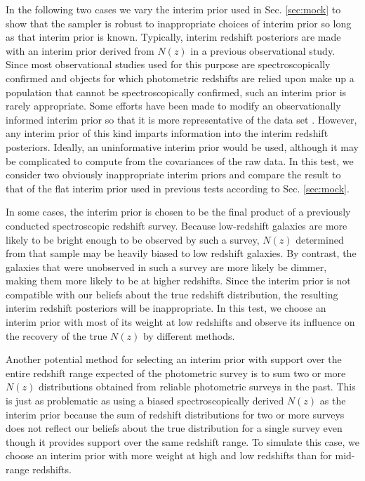 \documentclass[preprint]{aastex}
\begin{document}
In the following two cases we vary the interim prior used in Sec. 
\ref{sec:mock} to show that the sampler is robust to inappropriate choices of 
interim prior so long as that interim prior is known.  Typically, interim 
redshift posteriors are made with an interim prior derived from $N(z)$ in a 
previous observational study.  Since most observational studies used for this 
purpose are spectroscopically confirmed and objects for which photometric 
redshifts are relied upon make up a population that cannot be spectroscopically 
confirmed, such an interim prior is rarely appropriate.  Some efforts have been 
made to modify an observationally informed interim prior so that it is more 
representative of the data set \citep{Sheldon2012}.  However, any interim prior 
of this kind imparts information into the interim redshift posteriors.  
Ideally, an uninformative interim prior would be used, although it may be 
complicated to compute from the covariances of the raw data.  In this test, we 
consider two obviously inappropriate interim priors and compare the result to 
that of the flat interim prior used in previous tests according to Sec. 
\ref{sec:mock}.

In some cases, the interim prior is chosen to be the final product of a 
previously conducted spectroscopic redshift survey.  Because low-redshift 
galaxies are more likely to be bright enough to be observed by such a survey, 
$N(z)$ determined from that sample may be heavily biased to low redshift 
galaxies.  By contrast, the galaxies that were unobserved in such a survey are 
more likely be dimmer, making them more likely to be at higher redshifts.  
Since the interim prior is not compatible with our beliefs about the true 
redshift distribution, the resulting interim redshift posteriors will be 
inappropriate.  In this test, we choose an interim prior with most of its 
weight at low redshifts and observe its influence on the recovery of the true 
$N(z)$ by different methods.  

Another potential method for selecting an interim prior with support over the 
entire redshift range expected of the photometric survey is to sum two or more 
$N(z)$ distributions obtained from reliable photometric surveys in the past.  
This is just as problematic as using a biased spectroscopically derived $N(z)$ 
as the interim prior because the sum of redshift distributions for two or more 
surveys does not reflect our beliefs about the true distribution for a single 
survey even though it provides support over the same redshift range.  To 
simulate this case, we choose an interim prior with more weight at high and low 
redshifts than for mid-range redshifts.  
\end{document}
